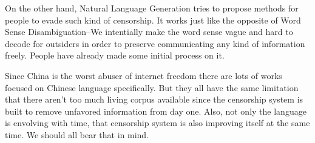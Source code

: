 \documentclass[11pt]{article} %
\begin{document}
On the other hand, Natural Language Generation tries to propose methods for people to evade such kind of censorship. It works just like the opposite of Word Sense Disambiguation--We intentially make the word sense vague and hard to decode for outsiders in order to preserve communicating any kind of information freely. People have already made some initial process on it.

Since China is the worst abuser of internet freedom there are lots of works focused on Chinese language specifically. But they all have the same limitation that there aren't too much living corpus available since the censorship system is built to remove unfavored information from day one. Also, not only the language is envolving with time, that censorship system is also improving itself at the same time. We should all bear that in mind.



\end{document}
